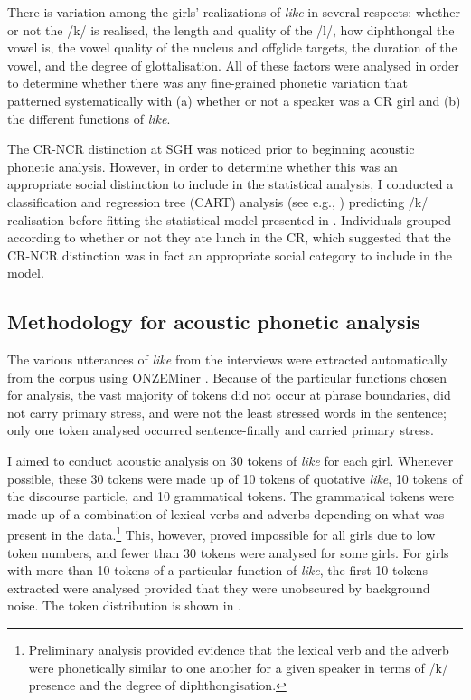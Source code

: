 There is variation among the girls' realizations of \textit{like} in several respects: whether or not the /k/ is realised, the length and quality of the /l/, how diphthongal the vowel is, the vowel quality of the nucleus and offglide targets, the duration of the vowel, and the degree of glottalisation. All of these factors were analysed in order to determine whether there was any fine-grained phonetic variation that patterned systematically with (a) whether or not a speaker was a CR girl and (b) the different functions of \textit{like}. 


The CR-NCR distinction at SGH was noticed prior to beginning acoustic phonetic analysis. However, in order to determine whether this was an appropriate social distinction to include in the statistical analysis, I conducted a classification and regression tree (CART) analysis (see e.g., \citealt{breimanetal1984}) predicting /k/ realisation before fitting the statistical model presented in . Individuals grouped according to whether or not they ate lunch in the CR, which suggested that the CR-NCR distinction was in fact an appropriate social category to include in the model. \nocite{breimanetal1984}



\subsection{Methodology for acoustic phonetic analysis}\label{sec:phoneticmethod}


The various utterances of \textit{like} from the interviews were extracted automatically from the corpus using ONZEMiner \citep{onzeminer}. Because of the particular functions chosen for analysis, the vast majority of tokens did not occur at phrase boundaries, did not carry primary stress, and were not the least stressed words in the sentence; only one token analysed occurred sentence-finally and carried primary stress. 

I aimed to conduct acoustic analysis on 30 tokens of \textit{like} for each girl. Whenever possible, these 30 tokens were made up of 10 tokens of quotative \textit{like}, 10 tokens of the discourse particle, and 10 grammatical tokens. The grammatical tokens were made up of a combination of lexical verbs and adverbs depending on what was present in the data.\footnote{Preliminary analysis provided evidence that the lexical verb and the adverb were phonetically similar to one another for a given speaker in terms of /k/ presence and the degree of diphthongisation.} This, however, proved impossible for all girls due to low token numbers, and fewer than 30 tokens were analysed for some girls. For girls with more than 10 tokens of a particular function of \textit{like}, the first 10 tokens extracted were analysed provided that they were unobscured by background noise. The token distribution is shown in .

